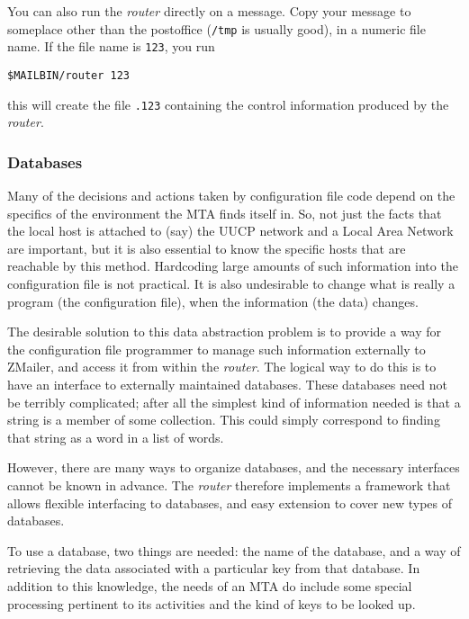 You can also run the {\em router\/} directly on a message.  Copy your message
to someplace other than the postoffice ({\tt /tmp} is usually good), in a
numeric file name.  If the file name is {\tt 123}, you run

\begin{verbatim}
$MAILBIN/router 123
\end{verbatim}


this will create the file {\tt .123} containing the control information
produced by the {\em router\/}.






\subsubsection{Databases\label{Databases}}



Many of the decisions and actions taken by configuration file code depend
on the specifics of the environment the MTA finds itself in.  So, not just
the facts that the local host is attached to (say) the UUCP network and a
Local Area Network are important, but it is also essential to know the specific
hosts that are reachable by this method.  Hardcoding large amounts of such
information into the configuration file is not practical.  It is also
undesirable to change what is really a program (the configuration file),
when the information (the data) changes.

The desirable solution to this data abstraction problem is to provide a way
for the configuration file programmer to manage such information externally
to ZMailer, and access it from within the {\em router\/}.  The logical way to do
this is to have an interface to externally maintained databases.  These
databases need not be terribly complicated; after all the simplest kind of
information needed is that a string is a member of some collection.  This
could simply correspond to finding that string as a word in a list of
words.

However, there are many ways to organize databases, and the necessary
interfaces cannot be known in advance.  The {\em router\/} therefore implements a
framework that allows flexible interfacing to databases, and easy extension
to cover new types of databases.

To use a database, two things are needed: the name of the database, and a
way of retrieving the data associated with a particular key from that
database.  In addition to this knowledge, the needs of an MTA do include
some special processing pertinent to its activities and the kind of keys to
be looked up.

